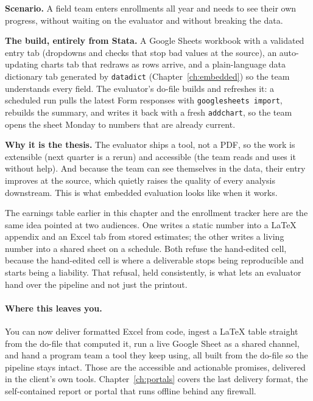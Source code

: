 \documentclass[
    a4paper,
    fontsize=10pt,
    twoside=true,
    numbers=noenddot,
]{kaobook}
\newcounter{appliedexample}
\newenvironment{appliedexample}[1][]{%
    \refstepcounter{appliedexample}%
    \begin{appliedexamplebox}[frametitle={Applied Example~\theappliedexample.~~#1}]%
}{%
    \end{appliedexamplebox}%
}
\begin{document}
\begin{appliedexample}[An enrollment tracker the field team keeps]
\textbf{Scenario.} A field team enters enrollments all year and needs to see their own progress, without waiting on the evaluator and without breaking the data.

\medskip
\textbf{The build, entirely from Stata.} A Google Sheets workbook with a validated entry tab (dropdowns and checks that stop bad values at the source), an auto-updating charts tab that redraws as rows arrive, and a plain-language data dictionary tab generated by \texttt{datadict} (Chapter~\ref{ch:embedded}) so the team understands every field. The evaluator's do-file builds and refreshes it: a scheduled run pulls the latest Form responses with \texttt{googlesheets import}, rebuilds the summary, and writes it back with a fresh \texttt{addchart}, so the team opens the sheet Monday to numbers that are already current.

\medskip
\textbf{Why it is the thesis.} The evaluator ships a tool, not a PDF, so the work is extensible (next quarter is a rerun) and accessible (the team reads and uses it without help). And because the team can see themselves in the data, their entry improves at the source, which quietly raises the quality of every analysis downstream. This is what embedded evaluation looks like when it works.
\end{appliedexample}

The earnings table earlier in this chapter and the enrollment tracker here are the same idea pointed at two audiences. One writes a static number into a \LaTeX{} appendix and an Excel tab from stored estimates; the other writes a living number into a shared sheet on a schedule. Both refuse the hand-edited cell, because the hand-edited cell is where a deliverable stops being reproducible and starts being a liability. That refusal, held consistently, is what lets an evaluator hand over the pipeline and not just the printout.

\paragraph{Where this leaves you.} You can now deliver formatted Excel from code, ingest a \LaTeX{} table straight from the do-file that computed it, run a live Google Sheet as a shared channel, and hand a program team a tool they keep using, all built from the do-file so the pipeline stays intact. Those are the accessible and actionable promises, delivered in the client's own tools. Chapter~\ref{ch:portals} covers the last delivery format, the self-contained report or portal that runs offline behind any firewall.
\end{document}
